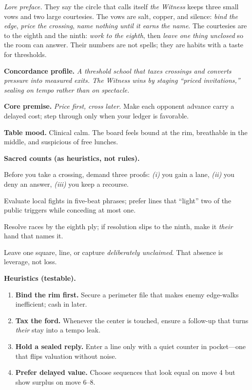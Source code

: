 \documentclass[11pt]{article}
\numberwithin{equation}{section} %
\theoremstyle{plain} %
\theoremstyle{definition} %
\theoremstyle{remark} %
\begin{document}
\noindent\textit{Lore preface.} They say the circle that calls itself \emph{the Witness} keeps three small vows and two large courtesies. The vows are salt, copper, and silence: \emph{bind the edge}, \emph{price the crossing}, \emph{name nothing until it earns the name}. The courtesies are to the eighth and the ninth: \emph{work to the eighth}, then \emph{leave one thing unclosed} so the room can answer. Their numbers are not spells; they are habits with a taste for thresholds.

\medskip
\noindent\textbf{Concordance profile.} \emph{A threshold school that taxes crossings and converts pressure into measured exits. The Witness wins by staging “priced invitations,” sealing on tempo rather than on spectacle.}

\medskip
\noindent\textbf{Core premise.} \textit{Price first, cross later.} Make each opponent advance carry a delayed cost; step through only when your ledger is favorable.

\medskip
\noindent\textbf{Table mood.} Clinical calm. The board feels bound at the rim, breathable in the middle, and suspicious of free lunches.

\medskip
\noindent\textbf{Sacred counts (as heuristics, not rules).}
\begin{description}\setlength\itemsep{0.35em}
  \item[\textbf{3} — Proof.] Before you take a crossing, demand three proofs: \emph{(i)} you gain a lane, \emph{(ii)} you deny an answer, \emph{(iii)} you keep a recourse.
  \item[\textbf{5} — Candles.] Evaluate local fights in five-beat phrases; prefer lines that “light” two of the public triggers while conceding at most one.
  \item[\textbf{8} — Work.] Resolve races by the eighth ply; if resolution slips to the ninth, make it \emph{their} hand that names it.
  \item[\textbf{9} — Remaining.] Leave one square, line, or capture \emph{deliberately unclaimed}. That absence is leverage, not loss.
\end{description}

\medskip
\noindent\textbf{Heuristics (testable).}
\begin{enumerate}\setlength\itemsep{0.25em}
  \item \textbf{Bind the rim first.} Secure a perimeter file that makes enemy edge-walks inefficient; cash in later.
  \item \textbf{Tax the ford.} Whenever the center is touched, ensure a follow-up that turns \emph{their} stay into a tempo leak.
  \item \textbf{Hold a sealed reply.} Enter a line only with a quiet counter in pocket—one that flips valuation without noise.
  \item \textbf{Prefer delayed value.} Choose sequences that look equal on move 4 but show surplus on move 6–8.
\end{enumerate}
\end{document}
